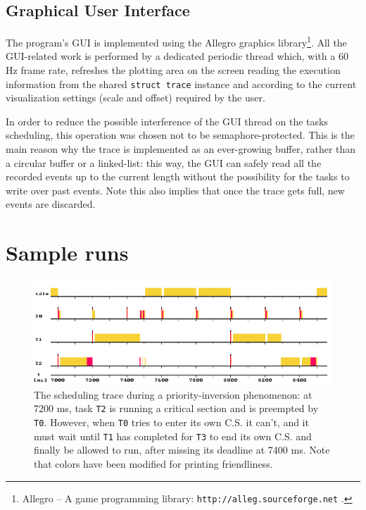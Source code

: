 \documentclass[paper=a4, fontsize=11pt]{scrartcl}
\newcommand{\mono}[1]{\texttt{#1}}
\numberwithin{equation}{section}        %
\numberwithin{figure}{section}          %
\numberwithin{table}{section}               %
\numberwithin{fragment}{section}
\begin{document}
\subsection{Graphical User Interface}\label{sec:gui}
The program's GUI is implemented using the Allegro graphics library\footnote{Allegro -- A game programming library: \mono{http://alleg.sourceforge.net} .}.
All the GUI-related work is performed by a dedicated periodic thread which, with a 60 Hz frame rate, refreshes the plotting area on the screen reading the execution information from the shared \mono{struct trace} instance and according to the current visualization settings (scale and offset) required by the user.

In order to reduce the possible interference of the GUI thread on the tasks scheduling, this operation was chosen not to be semaphore-protected. This is the main reason why the trace is implemented as an ever-growing buffer, rather than a circular buffer or a linked-list: this way, the GUI can safely read all the recorded events up to the current length without the possibility for the tasks to write over past events. Note this also implies that once the trace gets full, new events are discarded.


\section{Sample runs}\label{sec:runs}

\begin{figure}
  \centering
  \includegraphics[width=1\textwidth]{img/inversion.png}
  \caption{\label{fig:inversion} The scheduling trace during a priority-inversion phenomenon: at 7200 ms, task \mono{T2} is running a critical section and is preempted by \mono{T0}. However, when \mono{T0} tries to enter its own C.S. it can't, and it must wait until \mono{T1} has completed for \mono{T3} to end its own C.S. and finally be allowed to run, after missing its deadline at 7400 ms. Note that colors have been modified for printing friendliness.}
\end{figure}
\end{document}
